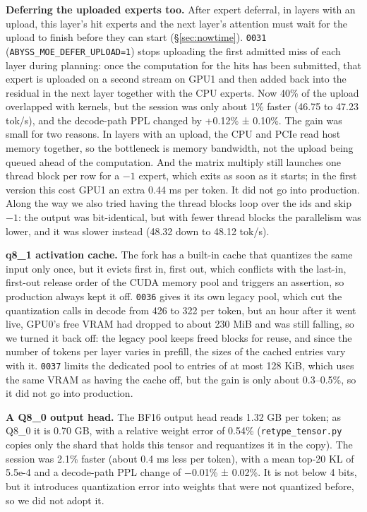 \documentclass[11pt,a4paper]{article}
\newcommand{\code}[1]{\texttt{#1}}
\newcommand{\tps}{tok/s}
\begin{document}
\textbf{Deferring the uploaded experts too.} After expert deferral, in layers with an upload, this layer's hit experts and the next layer's attention must wait for the upload to finish before they can start (\S\ref{sec:nowtime}). \code{0031} (\code{ABYSS\_MOE\_DEFER\_UPLOAD=1}) stops uploading the first admitted miss of each layer during planning: once the computation for the hits has been submitted, that expert is uploaded on a second stream on GPU1 and then added back into the residual in the next layer together with the CPU experts. Now 40\% of the upload overlapped with kernels, but the session was only about 1\% faster (46.75 to 47.23 \tps{}), and the decode-path PPL changed by +0.12\% ± 0.10\%. The gain was small for two reasons. In layers with an upload, the CPU and PCIe read host memory together, so the bottleneck is memory bandwidth, not the upload being queued ahead of the computation. And the matrix multiply still launches one thread block per row for a $-1$ expert, which exits as soon as it starts; in the first version this cost GPU1 an extra 0.44 ms per token. It did not go into production. Along the way we also tried having the thread blocks loop over the ids and skip $-1$: the output was bit-identical, but with fewer thread blocks the parallelism was lower, and it was slower instead (48.32 down to 48.12 \tps{}).

\textbf{q8\_1 activation cache.} The fork has a built-in cache that quantizes the same input only once, but it evicts first in, first out, which conflicts with the last-in, first-out release order of the CUDA memory pool and triggers an assertion, so production always kept it off. \code{0036} gives it its own legacy pool, which cut the quantization calls in decode from 426 to 322 per token, but an hour after it went live, GPU0's free VRAM had dropped to about 230 MiB and was still falling, so we turned it back off: the legacy pool keeps freed blocks for reuse, and since the number of tokens per layer varies in prefill, the sizes of the cached entries vary with it. \code{0037} limits the dedicated pool to entries of at most 128 KiB, which uses the same VRAM as having the cache off, but the gain is only about 0.3--0.5\%, so it did not go into production.

\textbf{A Q8\_0 output head.} The BF16 output head reads 1.32 GB per token; as Q8\_0 it is 0.70 GB, with a relative weight error of 0.54\% (\code{retype\_tensor.py} copies only the shard that holds this tensor and requantizes it in the copy). The session was 2.1\% faster (about 0.4 ms less per token), with a mean top-20 KL of 5.5e-4 and a decode-path PPL change of $-$0.01\% ± 0.02\%. It is not below 4 bits, but it introduces quantization error into weights that were not quantized before, so we did not adopt it.
\end{document}
